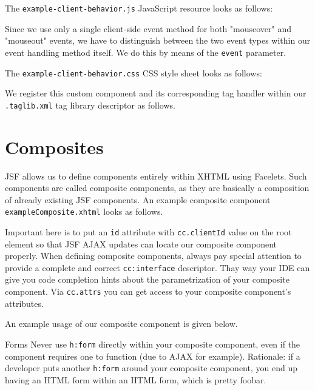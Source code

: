 The \texttt{example-client-behavior.js} JavaScript resource looks as follows:

Since we use only a single client-side event method for both "mouseover" and "mouseout" events, we have to distinguish between the two event types within our event handling method itself.
We do this by means of the \texttt{event} parameter.

The \texttt{example-client-behavior.css} CSS style sheet looks as follows:


We register this custom component and its corresponding tag handler within our \texttt{.taglib.xml} tag library descriptor as follows.


\section{Composites}
JSF allows us to define components entirely within XHTML using Facelets.
Such components are called composite components, as they are basically a composition of already existing JSF components.
An example composite component \texttt{exampleComposite.xhtml} looks as follows.

Important here is to put an \texttt{id} attribute with \texttt{cc.clientId} value on the root element so that JSF AJAX updates can locate our composite component properly.
When defining composite components, always pay special attention to provide a complete and correct \texttt{cc:interface} descriptor.
Thay way your IDE can give you code completion hints about the parametrization of your composite component.
Via \texttt{cc.attrs} you can get access to your composite component's attributes.

An example usage of our composite component is given below.

\begin{TIP}{Forms}
Never use \texttt{h:form} directly within your composite component, even if the component requires one to function (due to AJAX for example).
Rationale: if a developer puts another \texttt{h:form} around your composite component, you end up having an HTML form within an HTML form, which is pretty foobar.
\end{TIP}

